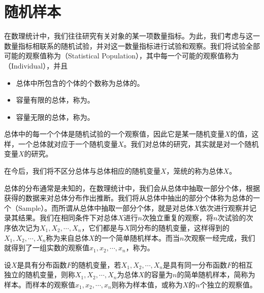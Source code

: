 \section{随机样本}
在数理统计中，我们往往研究有关对象的某一项数量指标。为此，我们考虑与这一数量指标相联系的随机试验，并对这一数量指标进行试验和观察。我们将试验全部可能的观察值称为（Statistical Population），其中每一个可能的观察值称为（Individual），并且
\begin{itemize}
    \item 总体中所包含的个体的个数称为总体的。
    \item 容量有限的总体，称为。
    \item 容量无限的总体，称为。
\end{itemize}
总体中的每一个个体是随机试验的一个观察值，因此它是某一随机变量$X$的值，这样，一个总体就对应于一个随机变量$X$。我们对总体的研究，其实就是对一个随机变量$X$的研究。

在今后，我们将不区分总体与总体相应的随机变量$X$，笼统的称为总体$X$。

总体的分布通常是未知的，在数理统计中，我们会从总体中抽取一部分个体，根据获得的数据来对总体分布作出推断。我们将从总体中抽出的部分个体称为总体的一个（Sample）。而所谓从总体中抽取一部分个体，就是对总体$X$依次进行观察并记录其结果。我们在相同条件下对总体$X$进行$n$次独立重复的观察，将$n$次试验的次序依次记为$X_1,X_2,\cdots,X_n$，它们都是与$X$同分布的随机变量，这样得到的$X_1,X_2,\cdots,X_n$称为来自总体$X$的一个简单随机样本。而当$n$次观察一经完成，我们就得到了一组实数的观察值$x_1,x_2,\cdots,x_n$，称为。
\begin{BoxDefinition}[样本]
    设$X$是具有分布函数$F$的随机变量，若$X_1,X_2,\cdots,X_n$是具有同一分布函数$F$的相互独立的随机变量，则称$X_1,X_2,\cdots,X_n$为总体$X$的容量为$n$的简单随机样本，简称为样本。而样本的观察值$x_1,x_2,\cdots,x_n$则称为样本值，或称为$X$的$n$个独立的观察值。
\end{BoxDefinition}

